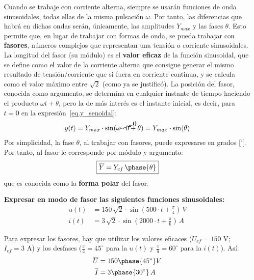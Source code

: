 Cuando se trabaje con corriente alterna, siempre se usarán funciones
de onda sinusoidales, todas ellas de la misma pulsación $\omega$. Por
tanto, las diferencias que habrá en dichas ondas serán, únicamente,
las amplitudes $Y_{max}$ y las fases $\theta$. Esto permite que, en
lugar de trabajar con formas de onda, se pueda trabajar con
\textbf{fasores}, números complejos que representan una tensión o
corriente
sinusoidales. %
La longitud del fasor (su módulo) es el \textbf{valor eficaz} de la
función sinusoidal, que se define como el valor de la corriente
alterna que consigue generar el mismo resultado de tensión/corriente
que si fuera en corriente continua, y se calcula como el valor máximo
entre $\sqrt{2}$ (como ya se justificó).
La posición del fasor, conocida como argumento, se determina en
cualquier instante de tiempo haciendo el producto $\omega t+\theta$,
pero la de más interés es el instante inicial, es decir, para $t=0$ en
la expresión~\eqref{eq.y_senoidal}:
\begin{equation*}
  y(t)=Y_{max}\cdot\sin(\cancelto{0}{\omega \cdot 0}+\theta)=Y_{max}\cdot\sin(\theta)
\end{equation*}
Por simplicidad, la fase $\theta$, al trabajar con fasores, puede
expresarse en grados [$^\circ$]. Por tanto, al fasor le corresponde
por módulo y argumento:
\begin{equation}
  \boxed{\overline{Y}=Y_{ef}\,\phase{\theta}}
\end{equation}
que es conocida como la \textbf{forma polar} del fasor.
	
\begin{example}
  \textbf{Expresar en modo de fasor las siguientes funciones
    sinusoidales:}
  \begin{align*}
    u(t)&=150\,\sqrt{2}\cdot \sin(500\cdot t+\frac{\pi}{4})\, V\\
    i(t) &= 3\,\sqrt{2}\cdot \sin(2000\cdot t+\frac{\pi}{6})\,A
  \end{align*}
		
  Para expresar los fasores, hay que utilizar los valores eficaces
  ($U_{ef}=150$ V; $I_{ef}=3$ A) y los desfases
  ($\frac{\pi}{4}=45^\circ$ para la $u(t)$ y $\frac{\pi}{6}=60^\circ$
  para la $i(t)$). Así:
  \begin{align*}
    \overline{U}&=150\phase{45^\circ} V\\
    \overline{I}&=3\phase{30^\circ}\,A
  \end{align*}
\end{example}
	
